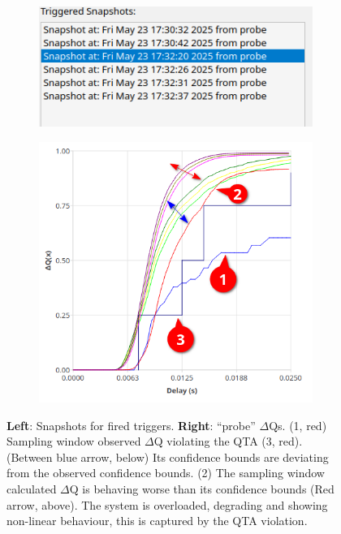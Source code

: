         \begin{figure}[H]
            \centering
            \begin{subfigure}{.5\textwidth}
                \centering
                \includegraphics[width=0.98\textwidth]{img/violated.png}
                \label{fig:high_load_1}
            \end{subfigure}%
            \begin{subfigure}{.5\textwidth}
                \centering
                \includegraphics[width =0.98\textwidth]{img/overload_2/qta_triggerd2.png}
                \label{fig:high_load_2}
            \end{subfigure}
            \caption{\textbf{Left}: Snapshots for fired triggers.
            \textbf{Right}: ``probe'' $\Delta$Qs. (1, red) Sampling window observed $\Delta$Q violating the QTA (3, red). (Between blue arrow, below) Its confidence bounds are deviating from the observed confidence bounds. (2) The sampling window calculated $\Delta$Q is behaving worse than its confidence bounds (Red arrow, above). The system is overloaded, degrading and showing non-linear behaviour, this is captured by the QTA violation.} %
            \label{fig:qta_viol_1}
        \end{figure}
        
